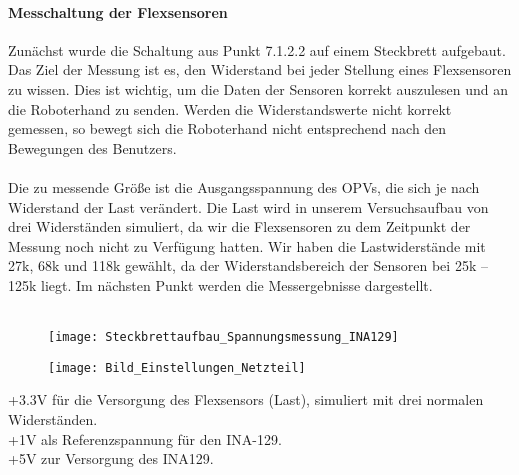 \documentclass[titlepage,12pt,twoside]{article}
\begin{document}
\paragraph{Messchaltung der Flexsensoren}
\hfill \break
\hfill \break
Zunächst wurde die Schaltung aus Punkt 7.1.2.2 auf einem Steckbrett aufgebaut. Das Ziel der Messung ist es, den Widerstand 
bei jeder Stellung eines Flexsensoren zu wissen. Dies ist wichtig, um die Daten der Sensoren korrekt auszulesen und an die 
Roboterhand zu senden. Werden die Widerstandswerte nicht korrekt gemessen, so bewegt sich die Roboterhand nicht entsprechend 
nach den Bewegungen des Benutzers. \\
\\
Die zu messende Größe ist die Ausgangsspannung des OPVs, die sich je nach Widerstand der Last verändert. Die Last wird in 
unserem Versuchsaufbau von drei Widerständen simuliert, da wir die Flexsensoren zu dem Zeitpunkt der Messung noch nicht zu 
Verfügung hatten. Wir haben die Lastwiderstände mit 27k, 68k und 118k gewählt, da der Widerstandsbereich der Sensoren bei 
25k – 125k liegt. Im nächsten Punkt werden die Messergebnisse dargestellt. \\
\\
\begin{figure}[H]
	\begin{center}
		\scalebox{1.0}
		{\texttt{[image: Steckbrettaufbau\_Spannungsmessung\_INA129]}}
	\end{center}
\end{figure}
\hfill \break
\hfill \break
\begin{figure}[H]
	\begin{center}
		\scalebox{1.0}
		{\texttt{[image: Bild\_Einstellungen\_Netzteil]}}
	\end{center}
\end{figure}
\hfill \break
+3.3V für die Versorgung des Flexsensors (Last), simuliert mit drei normalen Widerständen.\\
+1V als Referenzspannung für den INA-129.\\
+5V zur Versorgung des INA129.\\
\\
\end{document}
